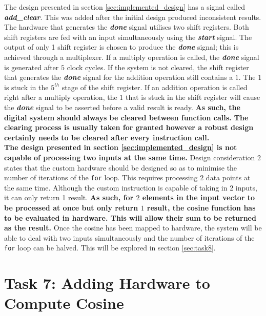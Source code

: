 \documentclass{article}
\begin{document}
The design presented in section \ref{sec:implemented_design} has a signal called \textbf{\textit{add\_clear}}. This was added after the initial design produced inconsistent results. The hardware that generates the \textbf{\textit{done}} signal utilises two shift registers. Both shift registers are fed with an input simultaneously using the \textbf{\textit{start}} signal. The output of only 1 shift register is chosen to produce the \textit{\textbf{done}} signal; this is achieved through a multiplexer. If a multiply operation is called, the \textbf{\textit{done}} signal is generated after $5$ clock cycles. If the system is not cleared, the shift register that generates the \textbf{\textit{done}} signal for the addition operation still contains a $1$. The $1$ is stuck in the $5^{th}$ stage of the shift register. If an addition operation is called right after a multiply operation, the $1$ that is stuck in the shift register will cause the \textbf{\textit{done}} signal to be asserted before a valid result is ready. \textbf{As such, the digital system should always be cleared between function calls. The clearing process is usually taken for granted however a robust design certainly needs to be cleared after every instruction call.}\\

\textbf{The design presented in section \ref{sec:implemented_design} is not capable of processing two inputs at the same time.} Design consideration $2$ states that the custom hardware should be designed so as to minimise the number of iterations of the {\tt for} loop. This requires processing $2$ data points at the same time. Although the custom instruction is capable of taking in 2 inputs, it can only return 1 result. \textbf{As such, for $2$ elements in the input vector to be processed at once but only return $1$ result, the cosine function has to be evaluated in hardware. This will allow their sum to be returned as the result.} Once the cosine has been mapped to hardware, the system will be able to deal with two inputs simultaneously and the number of iterations of the {\tt for} loop can be halved. This will be explored in section \ref{sec:task8}. 

\section{Task 7: Adding Hardware to Compute Cosine}\label{sec:task7}
\end{document}
